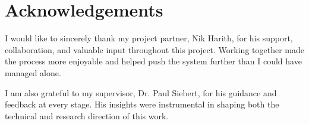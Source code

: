 \documentclass{l4proj}
\begin{document}
\chapter*{Acknowledgements}

%
%

I would like to sincerely thank my project partner, Nik Harith, for his support, collaboration, and valuable input throughout this project. Working together made the process more enjoyable and helped push the system further than I could have managed alone.

I am also grateful to my supervisor, Dr. Paul Siebert, for his guidance and feedback at every stage. His insights were instrumental in shaping both the technical and research direction of this work.


%
%
\def\consentname {Mok Kah Hou} %
\def\consentdate {30 October 2024} %
%
\educationalconsent


\tableofcontents

%
%
%
\end{document}
